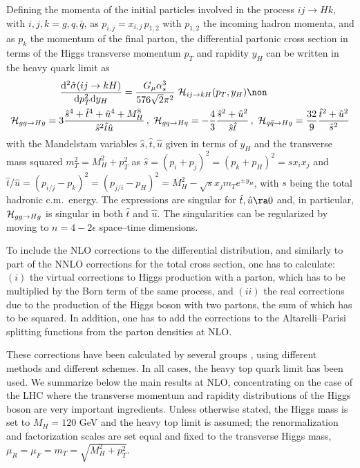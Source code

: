 Defining the momenta of the initial particles involved in the process $ij \to H
k$,  with $i,j,k=g, q, \bar{q}$, as $p_{i,j} = x_{i,j} \, p_{1,2}$ with
$p_{1,2}$ the incoming hadron momenta, and as $p_k$ the momentum of the final
parton, the differential partonic cross section in terms of the Higgs 
transverse momentum $p_T$ and rapidity  $y_H$ can be written in the heavy quark
limit as
\begin{eqnarray}
\frac{{\rm d}^2 \hat\sigma (ij \to kH)}{{\rm d} p_T^2 {\rm d}y_H }=  
\frac{G_\mu \alpha_s^3} {576 \sqrt{2} \pi^2}~{\cal H}_{ij \to kH} ( p_T, y_H) 
\non \hspace*{3cm} \\
{\cal H}_{gg\to Hg} = 3 \frac{\hat s^4+\hat t^4+\hat u^4+M_H^8}{\hat{s}^2
\hat t\hat u} \, , \ {\cal H}_{gq\to Hq} = -\frac{4}{3} \frac{\hat s^2+
\hat u^2}{ \hat s \hat t} \, ,  \ {\cal H}_{q\bar q\to Hg} = \frac{32}{9}
\frac{\hat t^2+\hat u^2} {\hat{s}^2}
\label{sigma:ij-kH}
\end{eqnarray}
with the Mandelstam variables $\hat{s}, \hat{t}, \hat{u}$ given in terms of
$y_H$ and the transverse mass squared $m_T^2=M_H^2+p_T^2$ as $\hat s =
(p_i+p_j)^2 = (p_k+p_H)^2 = s x_i x_j$ and $\hat t/ \hat u  = (p_{i/j}-p_k)^2
=(p_{j/i}- p_H)^2=M_H^2 -\sqrt{s} x_j m_T e^{\pm y_H}$, with $s$ being the
total hadronic c.m.~energy.  The expressions are singular for $\hat{t}, \hat{u}
\ra 0$ and, in particular, ${\cal H}_{gg \to Hg}$ is singular in both $\hat{t}$
and $\hat{u}$. The singularities can be regularized by moving to
$n=4-2\epsilon$ space--time dimensions.\s

To include the NLO corrections to the differential distribution, and similarly
to part of the NNLO corrections for the total cross section, one has to
calculate: $(i)$ the virtual corrections to Higgs production 
with a parton, which has to be multiplied by the Born term of the same process,
and $(ii)$ the real corrections due to the production of the Higgs boson with 
two partons, the sum of  which has to be squared. In addition, one has to add 
the corrections to the Altarelli--Parisi splitting functions from the parton 
densities  at NLO.\s
 
These corrections have been calculated by several  groups \cite{pp-ggH-PT1,Pt-eta-distrib,pp-ggH-Ital,pp-ggH-eta1,pp-ggH-eta2,pp-ggH-distrib}, using
different methods and different schemes. In all cases, the heavy top quark
limit has been used. We summarize below the main results at NLO, 
concentrating on the case of the LHC where the transverse momentum and rapidity
distributions of the Higgs boson are very important ingredients. Unless
otherwise stated, the Higgs mass is set to $M_H=120$ GeV and the heavy top
limit is assumed; the renormalization and factorization scales are set equal and
fixed to the transverse Higgs mass, $\mu_R=\mu_F = m_T= \sqrt{M_H^2+ p_T^2}$. \s

